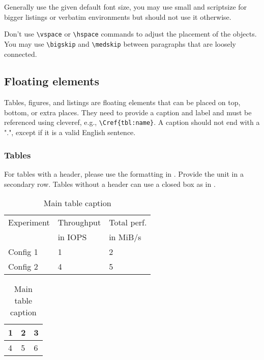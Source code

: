 \documentclass{jhps}
\begin{document}
\medskip

Generally use the given default font size, you may use small and scriptsize for bigger listings or verbatim environments but should not use it otherwise.

\medskip

Don't use \verb|\vspace| or \verb|\hspace| commands to adjust the placement of the objects.
You may use \verb|\bigskip| and \verb|\medskip| between paragraphs that are loosely connected.

\subsection{Floating elements}
Tables, figures, and listings are floating elements that can be placed on top, bottom, or extra places.
They need to provide a caption and label and must be referenced using cleveref, e.g., \verb|\Cref{tbl:name}|.
A caption should not end with a ".", except if it is a valid English sentence.

\subsubsection{Tables}

For tables with a header, please use the formatting in .
Provide the unit in a secondary row.
Tables without a header can use a closed box as in .

\begin{table}
  \centering
  \begin{subtable}[t]{8cm}
  \centering
  \begin{tabular}{l|l|l}
         \rowcolor{tblhead} Experiment  & Throughput & Total perf.
  \\
         \rowcolor{tblhead}   & in IOPS & in MiB/s \\
       \hline
       \hline
   Config 1 & 1   &  2   \\
  \hline
   Config 2 & 4   &  5   \\
  \end{tabular}
  \caption{Caption 1}\label{tbl:1a}
  \end{subtable}
  \begin{subtable}[t]{3cm}
  \centering
  \begin{tabular}{|l|l|l|}
  \hline
   1   &  2   &  3  \\
  \hline
   4   &  5   &  6  \\
  \hline
  \end{tabular}
  \caption{Caption 2}\label{tbl:1b}
  \end{subtable}
  \caption{Main table caption}\label{tbl:1}
\end{table}
\end{document}

